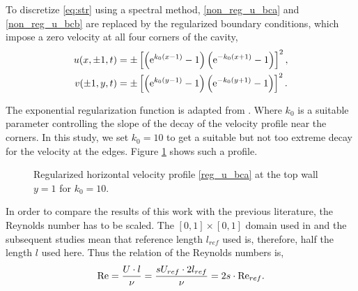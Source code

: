 To discretize \eqref{eq:str} using a spectral method, \eqref{non_reg_u_bca} and
\eqref{non_reg_u_bcb} are replaced by the regularized boundary conditions,
which impose a zero velocity at all four corners of the cavity,
\begin{align}
u(x,\pm 1,t) &= \pm\left[\left(\mathrm{e}^{k_0(x - 1)} - 1\right)
  \left(\mathrm{e}^{-k_0(x + 1)} - 1\right)\right]^2, \label{reg_u_bca} \\
v(\pm 1,y,t) &= \pm\left[\left(\mathrm{e}^{k_0(y - 1)} - 1\right)
  \left(\mathrm{e}^{-k_0(y + 1)} - 1\right)\right]^2. \label{reg_u_bcb}
\end{align}

The exponential regularization function is adapted from \citet{lopez2017}.
Where $k_0$ is a suitable parameter controlling the slope of the decay of the
velocity profile near the corners. In this study, we set $k_0=10$ to get a
suitable but not too extreme decay for the velocity at the edges. Figure
\ref{bc_profile} shows such a profile.

\begin{figure}[ht]
\center
{}
\caption{\label{bc_profile} Regularized horizontal velocity profile
  \eqref{reg_u_bca} at the top wall $y=1$ for $k_0=10$.}
\end{figure}

In order to compare the results of this work with the previous literature, the
Reynolds number has to be scaled. The $[0,1] \times [0,1]$ domain used in
\citet{wahba2009} and the subsequent studies mean that reference length
$l_{ref}$ used is, therefore, half the length $l$ used here. Thus the relation
of the Reynolds numbers is,
\vspace{-8pt}
\begin{align}
\mathrm{Re} = \frac{U \cdot l}{\nu} 
  = \frac{sU_{ref} \cdot 2l_{ref}}{\nu} = 2s \cdot \mathrm{Re}_{ref}.
\end{align}

